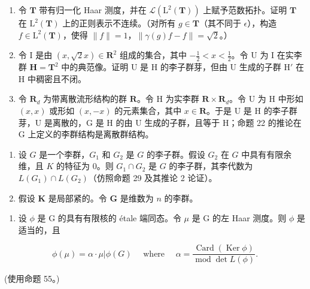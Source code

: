 \begin{enumerate}
\def\labelenumi{\arabic{enumi}.}
\setcounter{enumi}{7}
\item
  令 \(\mathbf{T}\) 带有归一化 Haar 测度，并在 \(\mathcal{L}(\mathrm{L}^2 (\mathbf{T}))\) 上赋予范数拓扑。证明 \(\mathbf{T}\) 在 \(\mathrm{L}^2 (\mathbf{T})\) 上的正则表示不连续。（对所有 \(g\in \mathbf{T}\)（其不同于 \(\epsilon\)），构造 \(f\in \mathrm{L}^2 (\mathbf{T})\)，使得 \(\| f\| = 1\)，\(\| \gamma (g)f - f\| = \sqrt{2}\)。）
\item
  令 I 是由 \((x, \sqrt{2} x) \in \mathbf{R}^2\) 组成的集合，其中 \(-\frac{1}{2} < x < \frac{1}{2}\)。令 U 为 I 在实李群 \(\mathbf{H} = \mathbf{T}^2\) 中的典范像。证明 U 是 H 的李子群芽，但由 U 生成的子群 \(\mathrm{H}'\) 在 H 中稠密且不闭。
\item
  令 \(\mathbf{R}_d\) 为带离散流形结构的群 \(\mathbf{R}\)。令 \(\mathrm{H}\) 为实李群 \(\mathbf{R} \times \mathbf{R}_d\)。令 \(\mathrm{U}\) 为 \(\mathrm{H}\) 中形如 \((x, x)\) 或形如 \((x, -x)\) 的元素集合，其中 \(x \in \mathbf{R}\)。于是 \(\mathrm{U}\) 是 \(\mathrm{H}\) 的李子群芽，\(\mathrm{U}\) 是离散的，\(\mathrm{G}\) 是 \(\mathrm{H}\) 的由 \(\mathrm{U}\) 生成的子群，且等于 \(\mathrm{H}\)；命题 22 的推论在 \(\mathrm{G}\) 上定义的李群结构是离散群结构。
\end{enumerate}


\begin{enumerate}
\def\labelenumi{\arabic{enumi}.}
\item
  设 \(G\) 是一个李群，\(G_1\) 和 \(G_2\) 是 \(G\) 的李子群。假设 \(G_2\) 在 \(G\) 中具有有限余维，且 \(K\) 的特征为 0。则 \(G_1 \cap G_2\) 是 \(G\) 的李子群，其李代数为 \(L(G_1) \cap L(G_2)\)（仿照命题 29 及其推论 2 论证）。
\item
  假设 \(\mathbf{K}\) 是局部紧的。令 \(\mathbf{G}\) 是维数为 \(n\) 的李群。
\end{enumerate}

\begin{enumerate}
\def\labelenumi{(\alph{enumi})}
\tightlist
\item
  设 \(\phi\) 是 G 的具有有限核的 étale 端同态。令 \(\mu\) 是 G 的左 Haar 测度。则 \(\phi\) 是适当的，且
\end{enumerate}

\[
\phi (\mu) = \alpha \cdot \mu | \phi (G) \quad \text { where } \quad \alpha = \frac {\operatorname{Card} (\operatorname{Ker} \phi)}{\operatorname{mod} \det L (\phi)}.
\]

(使用命题 55。)
